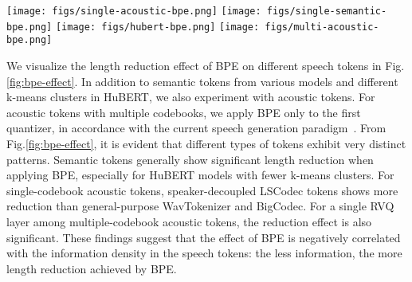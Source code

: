 \begin{figure*}
    \centering
    \texttt{[image: figs/single-acoustic-bpe.png]}
    \texttt{[image: figs/single-semantic-bpe.png]}
    \texttt{[image: figs/hubert-bpe.png]}
    \texttt{[image: figs/multi-acoustic-bpe.png]}
    \caption{BPE effect comparison of multiple tokens. The starting point of each line represents the original vocabulary size.}
    \label{fig:bpe-effect}
\end{figure*}
We visualize the length reduction effect of BPE on different speech tokens in Fig.\ref{fig:bpe-effect}. 
In addition to semantic tokens from various models and different k-means clusters in HuBERT, we also experiment with acoustic tokens.
For acoustic tokens with multiple codebooks, we apply BPE only to the first quantizer, in accordance with the current speech generation paradigm~\cite{valle}.
From Fig.\ref{fig:bpe-effect}, it is evident that different types of tokens exhibit very distinct patterns.
Semantic tokens generally show significant length reduction when applying BPE, especially for HuBERT models with fewer k-means clusters.
For single-codebook acoustic tokens, speaker-decoupled LSCodec tokens shows more reduction than general-purpose WavTokenizer and BigCodec.
For a single RVQ layer among multiple-codebook acoustic tokens, the reduction effect is also significant.
These findings suggest that the effect of BPE is negatively correlated with the information density in the speech tokens: the less information, the more length reduction achieved by BPE.

